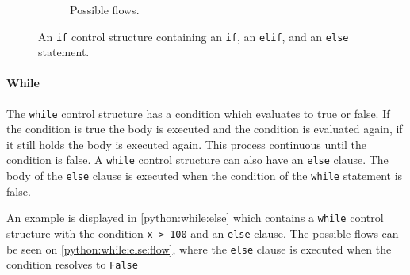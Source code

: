 \begin{figure}[H]
\begin{subfigure}[b]{0.4\textwidth}
    \caption{Possible flows.}
    \label{python:if:elif:flow}
  \end{subfigure}
  \caption{An \texttt{if} control structure containing an \texttt{if}, an \texttt{elif}, and an \texttt{else} statement.}
  \label{python:if:elif}
\end{figure}



\paragraph{While}
The \texttt{while} control structure has a condition which evaluates to true or false.
If the condition is true the body is executed and the condition is evaluated again, if it still holds the body is executed again.
This process continuous until the condition is false.
A \texttt{while} control structure can also have an \texttt{else} clause.
The body of the \texttt{else} clause is executed when the condition of the \texttt{while} statement is false.

An example is displayed in \cref{python:while:else} which contains a  \texttt{while} control structure with the condition \texttt{x > 100} and an \texttt{else} clause.
The possible flows can be seen on \cref{python:while:else:flow}, where the \texttt{else} clause is executed when the condition resolves to \texttt{False}

